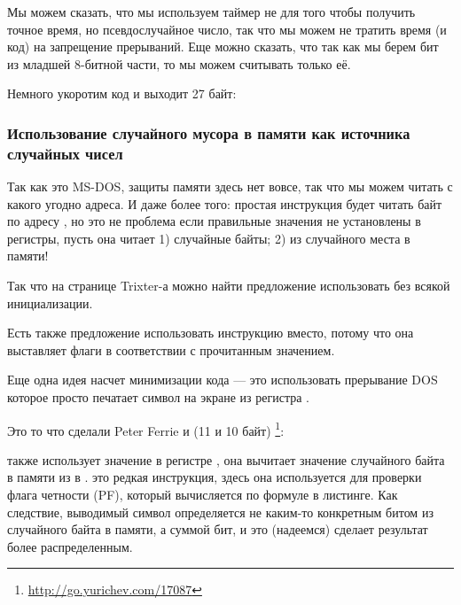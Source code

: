 Мы можем сказать, что мы используем таймер не для того чтобы получить точное время, но псевдослучайное число,
так что мы можем не тратить время (и код) на запрещение прерываний.
Еще можно сказать, что так как мы берем бит из младшей 8-битной части, то мы можем считывать только её.

Немного укоротим код и выходит 27 байт:



\subsubsection{Использование случайного мусора в памяти как источника случайных чисел}

Так как это MS-DOS, защиты памяти здесь нет вовсе, так что мы можем читать с какого
угодно адреса.
И даже более того: простая инструкция  
будет читать байт по адресу , но это не проблема
если правильные значения не установлены в регистры, пусть она читает 1) случайные байты; 2) из случайного
места в памяти!

Так что на странице Trixter-а\FNURLTRIXTER 
можно найти предложение использовать  без всякой инициализации.

Есть также предложение использовать инструкцию  
вместо, потому что она выставляет флаги в соответствии с прочитанным значением.

Еще одна идея насчет минимизации кода --- это использовать прерывание DOS
  которое просто печатает символ на экране
из регистра .

Это то что сделали Peter Ferrie и \HERMIT{} (11 и 10 байт)
\footnote{\url{http://go.yurichev.com/17087}}:



 также использует значение в регистре , она вычитает значение
случайного байта в памяти из
  в .
 это редкая инструкция, здесь она используется для проверки флага четности (PF),
который вычисляется по формуле в листинге.
Как следствие, выводимый символ определяется не каким-то конкретным битом из случайного байта в памяти,
а суммой бит, и это (надеемся) сделает результат более распределенным.

